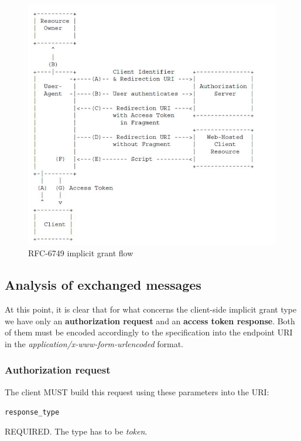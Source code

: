 \begin{figure}[h!]
    \centering
    \includegraphics[scale=0.6]{chapters/images/chp2/client.jpg}
    \caption{RFC-6749 implicit grant flow}
    \label{fig:flowa}
\end{figure}

\vspace{1cm}

\subsection{Analysis of exchanged messages}
At this point, it is clear that for what concerns the client-side implicit grant type we have only an \textbf{authorization request} and an \textbf{access token response}. Both of them must be encoded accordingly to the specification into the endpoint URI in the \textit{application/x-www-form-urlencoded} format.

\subsubsection{Authorization request}
\label{authreq}
The client MUST build this request using these parameters into the URI:

\texttt{response\_type}

\hspace{0.5cm}REQUIRED. The type has to be \textit{token}.

